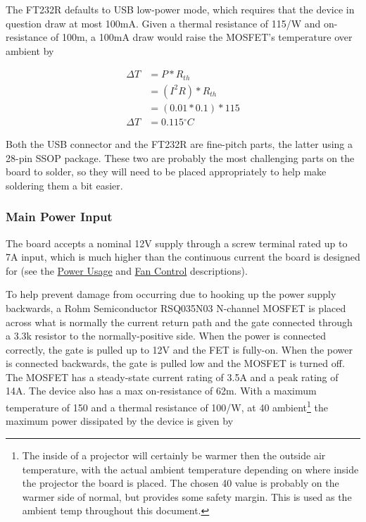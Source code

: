 \documentclass{article}
\newcommand{\degree}{\ensuremath{^{\circ}}}
\begin{document}
The FT232R defaults to USB low-power mode, which requires that the device in question draw at most
100mA.  Given a thermal resistance of 115\textcelsius{}/W and on-resistance of 100m\textOmega{}, a
100mA draw would raise the MOSFET's temperature over ambient by

\begin{align*}
    \Delta T &= P * R_{th} \\
    &= (I^2R) * R_{th} \\
    &= (0.01 * 0.1) * 115 \\
    \Delta T &= 0.115\degree C
\end{align*}

Both the USB connector and the FT232R are fine-pitch parts, the latter using a 28-pin SSOP package.
These two are probably the most challenging parts on the board to solder, so they will need to be
placed appropriately to help make soldering them a bit easier.

\subsubsection{Main Power Input} \label{sssec:MainPower}
The board accepts a nominal 12V supply through a screw terminal rated up to 7A input, which is much
higher than the continuous current the board is designed for (see the
\hyperref[ssec:PowerUsage]{Power Usage} and \hyperref[sssec:FanControl]{Fan Control} descriptions).

To help prevent damage from occurring due to hooking up the power supply backwards, a Rohm
Semiconductor RSQ035N03 N-channel MOSFET is placed across what is normally the current return path
and the gate connected through a 3.3k\textOmega{} resistor to the normally-positive side.  When the
power is connected correctly, the gate is pulled up to 12V and the FET is fully-on.  When the power
is connected backwards, the gate is pulled low and the MOSFET is turned off.  The MOSFET has a
steady-state current rating of 3.5A and a peak rating of 14A.  The device also has a max
on-resistance of 62m\textOmega{}.  With a maximum temperature of 150\textcelsius{} and a thermal
resistance of 100\textcelsius{}/W, at 40\textcelsius{} ambient\footnote{The inside of a projector
  will certainly be warmer then the outside air temperature, with the actual ambient temperature
  depending on where inside the projector the board is placed.  The chosen 40\textcelsius{} value is
  probably on the warmer side of normal, but provides some safety margin.  This is used as the
  ambient temp throughout this document.} the maximum power dissipated by the device is given by
\end{document}
